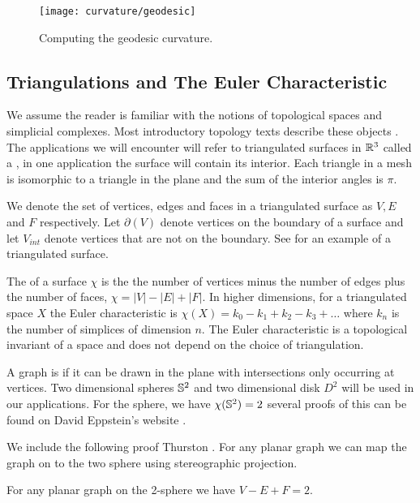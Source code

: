 \begin{figure}[htb]
	\centering
	\texttt{[image: curvature/geodesic]}
	\caption{Computing the geodesic curvature.}
	\label{fig:geodesic}
\end{figure}


\subsection{Triangulations and The Euler Characteristic}

We assume the reader is familiar with the notions
of topological spaces and simplicial complexes.
Most introductory topology texts describe these objects \cite{jm08,munkres}.
The applications we will encounter will refer to triangulated surfaces in $\mathbb{R}^3$
called a , in one application the surface will contain its interior.
Each triangle in a mesh is isomorphic to a triangle in the plane and the sum
of the interior angles is $\pi$.


We denote the set of vertices, edges and faces in a triangulated surface as 
$V, E$ and $F$ respectively.
Let $\partial(V)$ denote vertices on the boundary of a surface and let $V_{int}$ 
denote vertices that are not on the boundary.
See  for an example of a triangulated surface.



The  of a surface $\chi$ is the 
the number of vertices minus the number of edges plus  the number of faces, $\chi=|V|-|E|+|F|.$
In higher dimensions, for a triangulated space $X$ the Euler characteristic is 
$\chi(X)=k_0-k_1+k_2-k_3+\ldots$ where $k_n$ is the number of simplices of dimension $n.$
The Euler characteristic is a topological invariant of a space
and does not depend on the choice of triangulation.

A  graph  is  if it can be drawn in the plane with intersections only occurring
at vertices.
Two dimensional spheres $\mathbb{S}^2$ and two dimensional disk $D^2$ 
will be used in our applications.
For the sphere, we have $\chi(\mathbb{S}^2)=2$ 
several proofs of this can be found on David Eppstein's website \cite{eppstein-proofs}.




We include the following proof Thurston \cite{thurston}. 
For any planar graph we can map the graph on to the two sphere using stereographic projection.
 

\begin{theorem}\label{thm:euler}
For any planar graph on the 2-sphere we have $V-E+F=2.$
\end{theorem}

